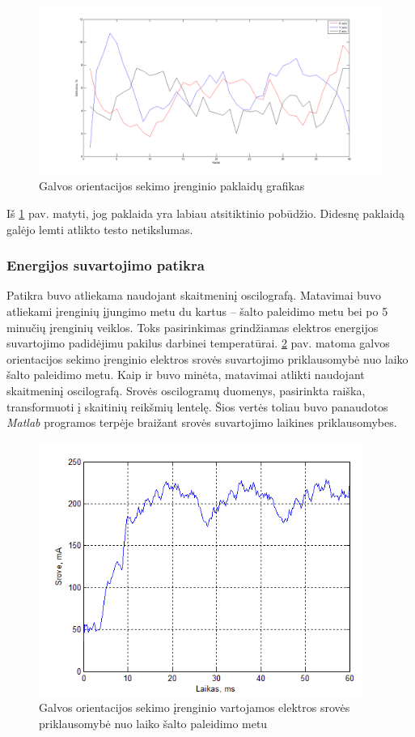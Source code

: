\documentclass[]{vgtuef}
\begin{document}
{\begin{figure}[htbp]
  \centering
  \includegraphics[width=500px]{img/headtracker_axis.png}
  \caption{Galvos orientacijos sekimo įrenginio paklaidų grafikas}
  \label{fig:headtracker_test3}
\end{figure}

Iš \ref{fig:headtracker_test3} pav. matyti, jog paklaida yra labiau atsitiktinio pobūdžio. Didesnę paklaidą galėjo lemti atlikto testo netikslumas.

\subsubsection{Energijos suvartojimo patikra}

Patikra buvo atliekama naudojant skaitmeninį oscilografą. Matavimai buvo atliekami įrenginių įjungimo metu du kartus -- šalto paleidimo metu bei po 5 minučių įrenginių veiklos. Toks pasirinkimas grindžiamas elektros energijos suvartojimo padidėjimu pakilus darbinei temperatūrai. \ref{fig:headtracker_coldboot} pav. matoma galvos orientacijos sekimo įrenginio elektros srovės suvartojimo priklausomybė nuo laiko šalto paleidimo metu. Kaip ir buvo minėta, matavimai atlikti naudojant skaitmeninį oscilografą. Srovės oscilogramų duomenys, pasirinkta raiška, transformuoti į skaitinių reikšmių lentelę. Šios vertės toliau buvo panaudotos \textit{Matlab} programos terpėje braižant srovės suvartojimo laikines priklausomybes.

\begin{figure}[htbp]
  \centering
  \includegraphics[width=400px]{img/head_tracker_coldboot.png}
  \caption{Galvos orientacijos sekimo įrenginio vartojamos elektros srovės priklausomybė nuo laiko šalto paleidimo metu}
  \label{fig:headtracker_coldboot}
\end{figure}

}
\end{document}
